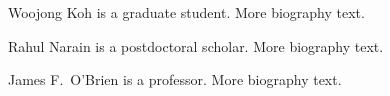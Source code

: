 \documentclass[10pt,journal,compsoc,twoside]{TexInputs/IEEEtran}
\begin{document}

\begin{IEEEbiography}
{Woojong Koh}
is a graduate student. More biography text.
\end{IEEEbiography}

\begin{IEEEbiography}
{Rahul Narain}
is a postdoctoral scholar. More biography text.
\end{IEEEbiography}

\begin{IEEEbiography}
{James F.~O'Brien}
is a professor. More biography text.
\end{IEEEbiography}

\vfill
\end{document}
